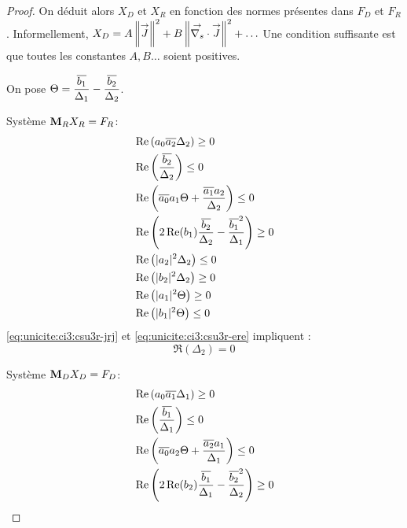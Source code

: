 \begin{proof}
    On déduit alors \(X_D\) et \(X_R\) en fonction des normes présentes dans \(F_D\) et \(F_R\). Informellement, \(X_D = A \left\lVert{\overset{\rightarrow}{J}}\right\rVert^2 + B \left\lVert{\overset{\rightarrow}{\nabla_s}} \cdot {\overset{\rightarrow}{J}}\right\rVert^2 + \ldots \) Une condition suffisante est que toutes les constantes \(A,B \ldots\) soient positives.

    On pose \(\Theta=\dfrac{{\overline{b_1}}}{\Delta_1}-\dfrac{{\overline{b_2}}}{\Delta_2}\).

    \begin{minipage}{0.49\textwidth}
      {Système \(\mathbf{M}_RX_R=F_R\)}:
      \begin{align}
        \label{eq:unicite:ci3:csu3r-j2}&\operatorname{Re}\left(a_0{\overline{a_2}}\Delta_2\right) \ge 0 \\
        \label{eq:unicite:ci3:csu3r-e2}&\operatorname{Re}\left(\dfrac{{\overline{b_2}}}{\Delta_2}\right) \le 0 \\
        \label{eq:unicite:ci3:csu3r-jdj}&\operatorname{Re}\left({\overline{a_0}}a_1\Theta + \dfrac{{\overline{a_1}}a_2}{\Delta_2} \right)\le 0\\
        \label{eq:unicite:ci3:csu3r-ede}&\operatorname{Re}\left(2\operatorname{Re}(b_1)\dfrac{{\overline{b_2}}}{\Delta_2}-\dfrac{{\overline{b_1}}^2}{\Delta_1}\right) \ge 0\\
        \label{eq:unicite:ci3:csu3r-jrj}&\operatorname{Re}\left(|a_2|^2\Delta_2\right) \le 0 \\
        \label{eq:unicite:ci3:csu3r-ere}&\operatorname{Re}\left(|b_2|^2\Delta_2\right) \ge 0 \\
        \label{eq:unicite:ci3:csu3r-rj2}&\operatorname{Re}\left(|a_1|^2\Theta\right)\ge 0\\
        \label{eq:unicite:ci3:csu3r-re2}&\operatorname{Re}\left(|b_1|^2\Theta\right)\le 0
      \end{align}
      \eqref{eq:unicite:ci3:csu3r-jrj} et \eqref{eq:unicite:ci3:csu3r-ere} impliquent :
      \begin{equation}
        \Re\left(\Delta_2\right) = 0
      \end{equation}
    \end{minipage}
    \begin{minipage}{0.49\textwidth}
      {Système \(\mathbf{M}_DX_D=F_D\)}:
      \begin{align}
        \label{eq:unicite:ci3:csu3d-j2}&\Re\left(a_0\conj{a_1}\Delta_1\right) \ge 0 \\
        \label{eq:unicite:ci3:csu3d-e2}&\Re\left(\frac{\conj{b_1}}{\Delta_1}\right) \le 0 \\
        \label{eq:unicite:ci3:csu3d-jrj}&\Re\left(\conj{a_0}a_2\Theta + \frac{\conj{a_2}a_1}{\Delta_1} \right)\le 0\\
        \label{eq:unicite:ci3:csu3d-ere}&\Re\left(2\Re(b_2)\frac{\conj{b_1}}{\Delta_1}-\frac{\conj{b_2}^2}{\Delta_2}\right) \ge 0\\

\end{align}
\end{minipage}
\end{proof}
